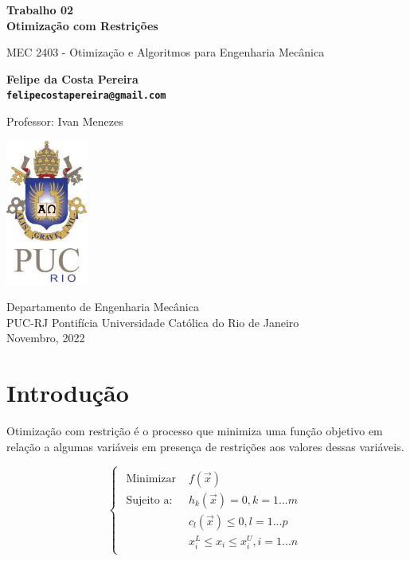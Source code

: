 \documentclass[10pt, a4paper]{article}
\begin{document}
\begin{titlepage}
      \begin{center}
          \vspace*{1cm}

          \Huge
          \textbf{Trabalho 02 \\ Otimiza\c c\~ao com Restri\c c\~oes}

          \vspace{0.5cm}
          \LARGE
          MEC 2403 - Otimiza\c c\~ao e Algoritmos para Engenharia Mec\^anica

          \vspace{1.5cm}

          \textbf{Felipe da Costa Pereira \\ {\tt felipecostapereira@gmail.com}}

          \vfill
          Professor: Ivan Menezes

          \vspace{0.8cm}

          \includegraphics[width=0.2\textwidth]{puc.jpg}

          \Large
          Departamento de Engenharia Mec\^anica\\
          PUC-RJ Pontif\'icia Universidade Cat\'olica do Rio de Janeiro\\
          Novembro, 2022

      \end{center}
  \end{titlepage}

\section{Introdu\c c\~ao}

Otimiza\c c\~ao com restri\c c\~ao \'e o processo que minimiza uma fun\c c\~ao objetivo em rela\c c\~ao a algumas vari\'aveis em presen\c ca de restri\c c\~oes aos valores dessas vari\'aveis.

\[
\begin{cases}
      \begin{aligned}
      \text{Minimizar }  & f(\vec{x})\\
      \text{Sujeito a: } & h_k(\vec{x})=0,            \text{$k=1...m$}\\
                        & c_l(\vec{x})\leq 0,        \text{$l=1...p$}\\
                        & x_i^L \leq x_i \leq x_i^U, \text{$i=1...n$}
      \end{aligned}
\end{cases}
\]
\end{document}
